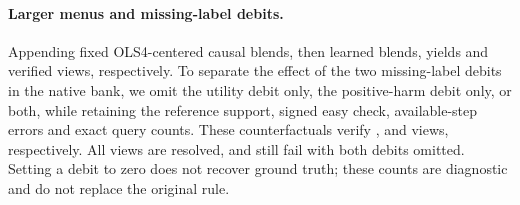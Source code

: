 \paragraph{Larger menus and missing-label debits.}
Appending fixed OLS4-centered causal blends, then learned blends,
yields \BlendCausal{} and \BlendNeural{} verified views, respectively.
To separate the effect of the two missing-label debits in the
native bank, we omit the utility debit only, the positive-harm
debit only, or both, while retaining the reference support,
signed easy check, available-step errors and exact query counts.
These counterfactuals verify \NoUtilityDebit{}, \NoRiskDebit{}
and \NoBothDebit{} views, respectively. All views are resolved,
and \StillFailNoDebits{} still fail with both debits omitted.
Setting a debit to zero does not recover ground truth; these
counts are diagnostic and do not replace the original rule.
